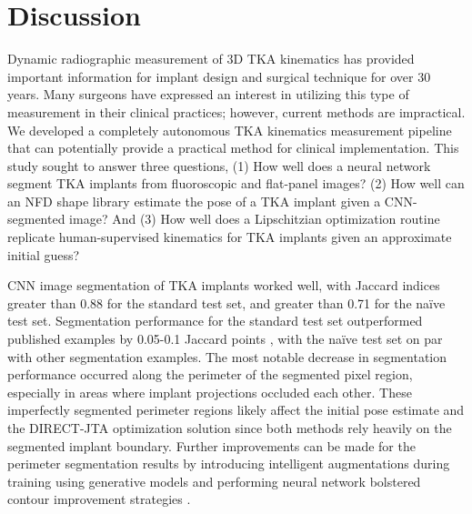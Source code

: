 {\section{Discussion}
Dynamic radiographic measurement of 3D TKA kinematics has provided important
information for implant design and surgical technique for over 30 years. Many
surgeons have expressed an interest in utilizing this type of measurement in
their clinical practices; however, current methods are impractical. We developed
a completely autonomous TKA kinematics measurement pipeline that can potentially
provide a practical method for clinical implementation. This study sought to
answer three questions, (1) How well does a neural network segment TKA implants
from fluoroscopic and flat-panel images? (2) How well can an NFD shape library
estimate the pose of a TKA implant given a CNN-segmented image? And (3) How well
does a Lipschitzian optimization routine replicate human-supervised kinematics
for TKA implants given an approximate initial guess?

CNN image segmentation of TKA implants worked well, with Jaccard indices greater
than 0.88 for the standard test set, and greater than 0.71 for the naïve test
set. Segmentation performance for the standard test set outperformed published
examples by 0.05-0.1 Jaccard points
\cite{zhouUNetNestedUNet2018,rodriguesDeepSegmentationLeverages2019}, with the
naïve test set on par with other segmentation examples. The most notable
decrease in segmentation performance occurred along the perimeter of the
segmented pixel region, especially in areas where implant projections occluded
each other. These imperfectly segmented perimeter regions likely affect the
initial pose estimate and the DIRECT-JTA optimization solution since both
methods rely heavily on the segmented implant boundary. Further improvements can
be made for the perimeter segmentation results by introducing intelligent
augmentations during training using generative models
\cite{hatayaFasterAutoAugmentLearning2019} and performing neural network
bolstered contour improvement strategies
\cite{yuanSegFixModelAgnosticBoundary2020}.

}
